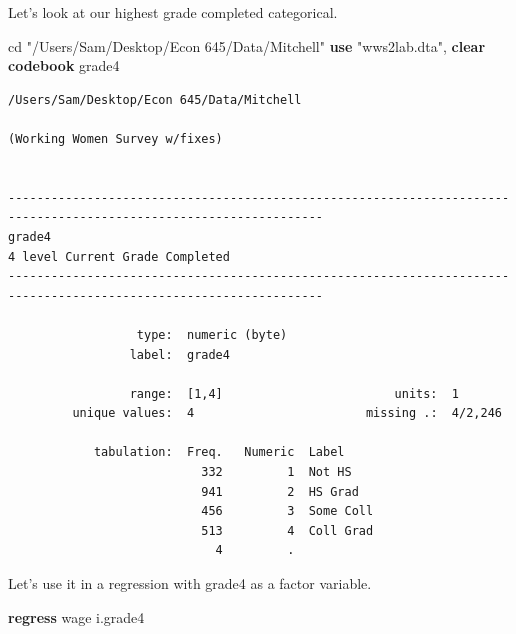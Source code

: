 \documentclass[
]{book}
\newenvironment{Shaded}{\begin{snugshade}}{\end{snugshade}}
\newcommand{\KeywordTok}[1]{\textcolor[rgb]{0.13,0.29,0.53}{\textbf{#1}}}
\newcommand{\NormalTok}[1]{#1}
\newcommand{\StringTok}[1]{\textcolor[rgb]{0.31,0.60,0.02}{#1}}
\begin{document}
Let's look at our highest grade completed categorical.

\begin{Shaded}
\begin{Highlighting}[]
\NormalTok{cd }\StringTok{"/Users/Sam/Desktop/Econ 645/Data/Mitchell"}
\KeywordTok{use} \StringTok{"wws2lab.dta"}\NormalTok{, }\KeywordTok{clear}
\KeywordTok{codebook}\NormalTok{ grade4}
\end{Highlighting}
\end{Shaded}

\begin{verbatim}
/Users/Sam/Desktop/Econ 645/Data/Mitchell

(Working Women Survey w/fixes)


------------------------------------------------------------------------------------------------------------------
grade4                                                                             4 level Current Grade Completed
------------------------------------------------------------------------------------------------------------------

                  type:  numeric (byte)
                 label:  grade4

                 range:  [1,4]                        units:  1
         unique values:  4                        missing .:  4/2,246

            tabulation:  Freq.   Numeric  Label
                           332         1  Not HS
                           941         2  HS Grad
                           456         3  Some Coll
                           513         4  Coll Grad
                             4         .  
\end{verbatim}

Let's use it in a regression with grade4 as a factor variable.

\begin{Shaded}
\begin{Highlighting}[]
\KeywordTok{regress}\NormalTok{ wage i.grade4}
\end{Highlighting}
\end{Shaded}
\end{document}
